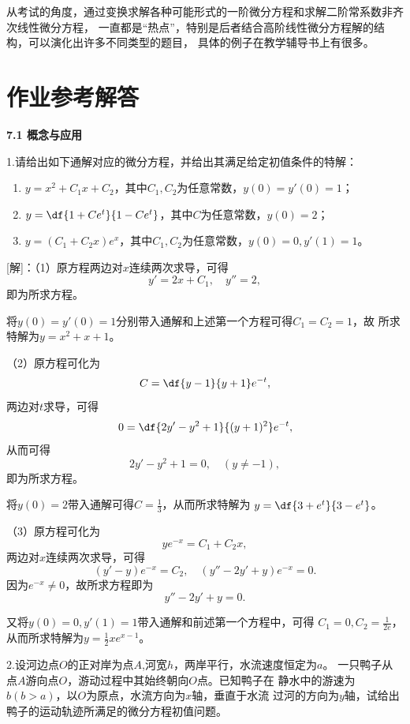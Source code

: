 从考试的角度，通过变换求解各种可能形式的一阶微分方程和求解二阶常系数非齐次线性微分方程，
一直都是“热点”，特别是后者结合高阶线性微分方程解的结构，可以演化出许多不同类型的题目，
具体的例子在教学辅导书上有很多。

\newpage

\section*{作业参考解答}

\begin{center}
	\bf 7.1 概念与应用
\end{center}

1.请给出如下通解对应的微分方程，并给出其满足给定初值条件的特解：
  \begin{enumerate}[(1)]
    \setlength{\itemindent}{1cm}
    \item $y=x^2+C_1x+C_2$，其中$C_1,C_2$为任意常数，$y(0)=y'(0)=1$； 
    \item $y=\df{1+Ce^t}{1-Ce^t}$，其中$C$为任意常数，$y(0)=2$；
    \item $y=(C_1+C_2x)e^x$，其中$C_1,C_2$为任意常数，$y(0)=0,y'(1)=1$。
  \end{enumerate}

[解]：（1）原方程两边对$x$连续两次求导，可得
$$y'=2x+C_1,\quad y''=2,$$
即为所求方程。

将$y(0)=y'(0)=1$分别带入通解和上述第一个方程可得$C_1=C_2=1$，故
所求特解为$y=x^2+x+1$。

（2）原方程可化为
$$C=\df{y-1}{y+1}e^{-t},$$
两边对$t$求导，可得
$$0=\df{2y'-y^2+1}{(y+1)^2}e^{-t},$$
从而可得
$$2y'-y^2+1=0,\quad(y\ne-1),$$
即为所求方程。

将$y(0)=2$带入通解可得$C=\frac13$，从而所求特解为
$y=\df{3+e^t}{3-e^t}$。


（3）原方程可化为
$$ye^{-x}=C_1+C_2x,$$
两边对$x$连续两次求导，可得
$$(y'-y)e^{-x}=C_2,\quad
(y''-2y'+y)e^{-x}=0.$$
因为$e^{-x}\ne0$，故所求方程即为
$$y''-2y'+y=0.$$

又将$y(0)=0,y'(1)=1$带入通解和前述第一个方程中，可得
$C_1=0,C_2=\frac1{2e}$，从而所求特解为$y=\frac12xe^{x-1}$。
\fin

\bs

2.设河边点$O$的正对岸为点$A$,河宽$h$，两岸平行，水流速度恒定为$a$。
一只鸭子从点$A$游向点$O$，游动过程中其始终朝向$O$点。已知鸭子在
静水中的游速为$b(b>a)$，以$O$为原点，水流方向为$x$轴，垂直于水流
过河的方向为$y$轴，试给出鸭子的运动轨迹所满足的微分方程初值问题。

